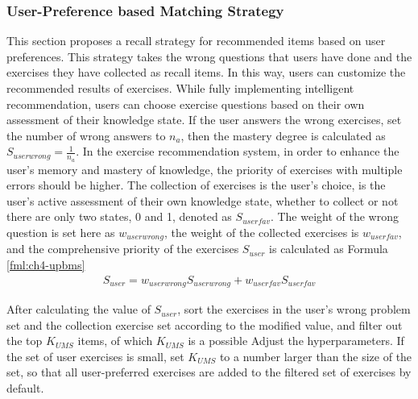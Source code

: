 \subsubsection{User-Preference based Matching Strategy}


This section proposes a recall strategy for recommended items based on user preferences. This strategy takes the wrong questions that users have done and the exercises they have collected as recall items. In this way, users can customize the recommended results of exercises. While fully implementing intelligent recommendation, users can choose exercise questions based on their own assessment of their knowledge state. If the user answers the wrong exercises, set the number of wrong answers to \(n_a\), then the mastery degree is calculated as \(S_{userwrong}=\frac{1}{n_a}\). In the exercise recommendation system, in order to enhance the user's memory and mastery of knowledge, the priority of exercises with multiple errors should be higher. The collection of exercises is the user's choice, is the user's active assessment of their own knowledge state, whether to collect or not there are only two states, 0 and 1, denoted as \(S_{userfav}\). The weight of the wrong question is set here as \(w_{userwrong}\), the weight of the collected exercises is \(w_{userfav}\), and the comprehensive priority of the exercises \(S_{user}\) is calculated as Formula \ref{fml:ch4-upbms}
\begin{align}
  S_{user} = w_{userwrong}S_{userwrong} + w_{userfav}S_{userfav} \label{fml:ch4-upbms}
\end{align}

After calculating the value of \(S_{user}\), sort the exercises in the user's wrong problem set and the collection exercise set according to the modified value, and filter out the top \(K_{UMS}\) items, of which \(K_{UMS}\) is a possible Adjust the hyperparameters. If the set of user exercises is small, set \(K_{UMS}\) to a number larger than the size of the set, so that all user-preferred exercises are added to the filtered set of exercises by default.

